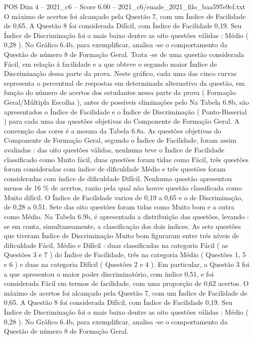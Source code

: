 \begin{textsample}{POS Dim 4 – 2021\_c6 – Score 6.00 – 2021\_c6/enade\_2021\_filo\_baa597e9cf.txt}
O máximo de acertos foi alcançado pela Questão 7, com um Índice de Facilidade de 0,65.
A Questão 8 foi considerada Difícil, com Índice de Facilidade 0,19.
Seu Índice de Discriminação foi o mais baixo dentre as oito questões válidas : Médio ( 0,28 ).
No Gráfico 6.4b, para exemplificar, analisa -se o comportamento da Questão de número 8 de Formação Geral.
Trata -se de uma questão considerada Fácil, em relação à facilidade e a que obteve o segundo maior Índice de Discriminação dessa parte da prova.
Neste gráfico, cada uma das cinco curvas representa o percentual de respostas em determinada alternativa da questão, em função do número de acertos dos estudantes nessa parte da prova ( Formação Geral/Múltipla Escolha ), antes de possíveis eliminações pelo Na Tabela 6.8b, são apresentados o Índice de Facilidade e o Índice de Discriminação ( Ponto-Bisserial ) para cada uma das questões objetivas do Componente de Formação Geral.
A convenção das cores é a mesma da Tabela 6.8a.
As questões objetivas do Componente de Formação Geral, segundo o Índice de Facilidade, foram assim avaliadas : das oito questões válidas, nenhuma teve o Índice de Facilidade classificado como Muito fácil, duas questões foram tidas como Fácil, três questões foram consideradas com índice de dificuldade Médio e três questões foram consideradas com índice de dificuldade Difícil.
Nenhuma questão apresentou menos de 16 \% de acertos, razão pela qual não houve questão classificada como Muito difícil.
O Índice de Facilidade variou de 0,19 a 0,65 e o de Discriminação, de 0,28 a 0,51.
Sete das oito questões foram tidas como Muito bom e a outra como Médio.
Na Tabela 6.9b, é apresentada a distribuição das questões, levando -se em conta, simultaneamente, a classificação dos dois índices.
As sete questões que tiveram Índice de Discriminação Muito bom figuraram entre três níveis de dificuldade Fácil, Médio e Difícil : duas classificadas na categoria Fácil ( as Questões 3 e 7 ) do Índice de Facilidade, três na categoria Médio ( Questões 1, 5 e 6 ) e duas na categoria Difícil ( Questões 2 e 4 ).
Em particular, a Questão 3 foi a que apresentou o maior poder discriminatório, com índice 0,51, e foi considerada Fácil em termos de facilidade, com uma proporção de 0,62 acertos.
O máximo de acertos foi alcançado pela Questão 7, com um Índice de Facilidade de 0,65.
A Questão 8 foi considerada Difícil, com Índice de Facilidade 0,19.
Seu Índice de Discriminação foi o mais baixo dentre as oito questões válidas : Médio ( 0,28 ).
No Gráfico 6.4b, para exemplificar, analisa -se o comportamento da Questão de número 8 de Formação Geral.

\end{textsample}
